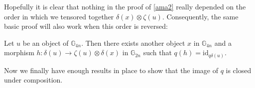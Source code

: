 Hopefully it is clear that nothing in the proof of \cref{ama2} really depended on the order in which we tensored together $\delta(x) \otimes \zeta(u)$. Consequently, the same basic proof will also work when this order is reversed:

\begin{cor}\label{ama4} Let $u$ be an object of $\mathbb{G}_{4n}$. Then there exists another object $x$ in $\mathbb{G}_{4n}$ and a morphism $h: \delta(u) \to \zeta(u) \otimes \delta(x)$ in $\mathbb{G}_{2n}$ such that $q(h) = \mathrm{id}_{q\delta(u)}$.
\end{cor}

Now we finally have enough results in place to show that the image of $q$ is closed under composition.

